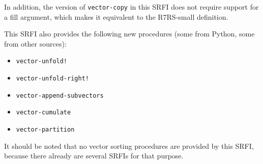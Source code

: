 In addition, the version of \texttt{vector-copy} in this SRFI does not
require support for a fill argument, which makes it equivalent to the
R7RS-small definition.

This SRFI also provides the following new procedures (some from Python,
some from other sources):

\begin{itemize}
\tightlist
\item
  \texttt{vector-unfold!}
\item
  \texttt{vector-unfold-right!}
\item
  \texttt{vector-append-subvectors}
\item
  \texttt{vector-cumulate}
\item
  \texttt{vector-partition}
\end{itemize}

It should be noted that no vector sorting procedures are provided by
this SRFI, because there already are several SRFIs for that purpose.

